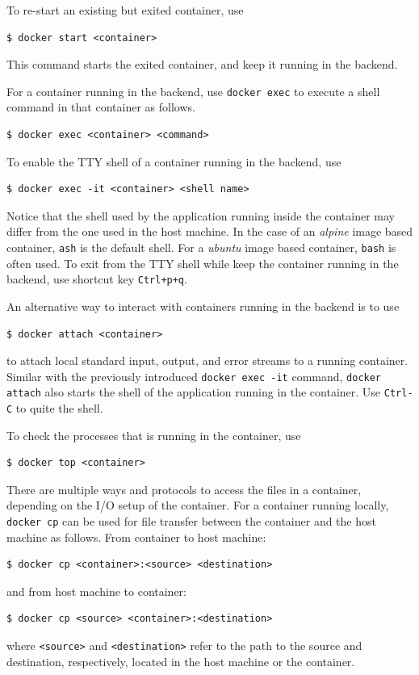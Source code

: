 To re-start an existing but exited container, use
\begin{lstlisting}
$ docker start <container>
\end{lstlisting}
This command starts the exited container, and keep it running in the backend.

For a container running in the backend, use \verb|docker exec| to execute a shell command in that container as follows.
\begin{lstlisting}
$ docker exec <container> <command>
\end{lstlisting}

To enable the TTY shell of a container running in the backend, use
\begin{lstlisting}
$ docker exec -it <container> <shell name>
\end{lstlisting}
Notice that the shell used by the application running inside the container may differ from the one used in the host machine. In the case of an \textit{alpine} image based container, \verb|ash| is the default shell. For a \textit{ubuntu} image based container, \verb|bash| is often used. To exit from the TTY shell while keep the container running in the backend, use shortcut key \verb|Ctrl+p+q|.

An alternative way to interact with containers running in the backend is to use
\begin{lstlisting}
$ docker attach <container>
\end{lstlisting}
to attach local standard input, output, and error streams to a running container. Similar with the previously introduced \texttt{docker exec -it} command, \texttt{docker attach} also starts the shell of the application running in the container. Use \verb|Ctrl-C| to quite the shell.

To check the processes that is running in the container, use
\begin{lstlisting}
$ docker top <container>
\end{lstlisting}

There are multiple ways and protocols to access the files in a container, depending on the I/O setup of the container. For a container running locally, \verb|docker cp| can be used for file transfer between the container and the host machine as follows. From container to host machine:
\begin{lstlisting}
$ docker cp <container>:<source> <destination>
\end{lstlisting}
and from host machine to container:
\begin{lstlisting}
$ docker cp <source> <container>:<destination>
\end{lstlisting}
where \verb|<source>| and \verb|<destination>| refer to the path to the source and destination, respectively, located in the host machine or the container.

